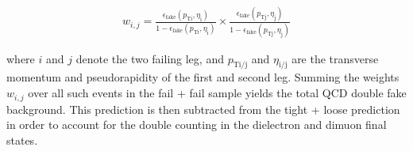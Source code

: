 \begin{eqnarray}
  w_{i,j} = \frac{\epsilon_{\mathrm{fake}}(p_{\mathrm{T i}},\eta_{\mathrm{i}})}{1 - \epsilon_{\mathrm{fake}}(p_{\mathrm{T i}},\eta_{\mathrm{i}})} \times \frac{\epsilon_{\mathrm{fake}}(p_{\mathrm{T j}},\eta_{\mathrm{j}})}{1 - \epsilon_{\mathrm{fake}}(p_{\mathrm{T j}},\eta_{\mathrm{j}})}
\end{eqnarray}

where $i$ and $j$ denote the two failing leg, and $p_{\mathrm{T i/j}}$ and $\eta_{\mathrm{i/j}}$
are the transverse momentum and pseudorapidity of the first and second leg.
Summing the weights $w_{i,j}$ over all such events in the fail + fail sample yields
the total QCD double fake background. This prediction is then subtracted from the
tight + loose prediction in order to account for the double counting in the dielectron
and dimuon final states. 



